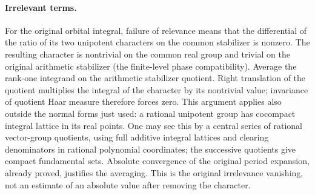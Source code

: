 \paragraph{Irrelevant terms.}
For the original orbital integral, failure of relevance means that
the differential of the ratio of its two unipotent characters on
the common stabilizer is nonzero. The resulting character is
nontrivial on the common real group and trivial on the original
arithmetic stabilizer (the finite-level phase compatibility).
Average the rank-one integrand on the arithmetic stabilizer
quotient. Right translation of the quotient multiplies the
integral of the character by its nontrivial value; invariance of
quotient Haar measure therefore forces zero. This argument applies
also outside the normal forms just used: a rational unipotent
group has cocompact integral lattice in its real points.
One may see this by a central series of rational vector-group
quotients, using full additive integral lattices and clearing
denominators in rational polynomial coordinates; the successive
quotients give compact fundamental sets. Absolute convergence
of the original period expansion, already proved, justifies
the averaging. This is the original irrelevance vanishing, not
an estimate of an absolute value after removing the character.

